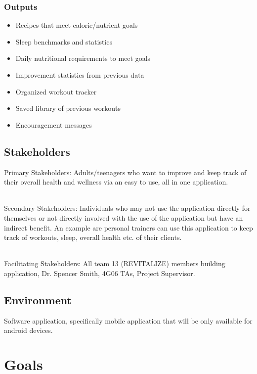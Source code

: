 \documentclass[12pt,letterpaper]{article}
\begin{document}
\subsubsection{Outputs}
\begin{itemize}
    \item Recipes that meet calorie/nutrient goals
    \item Sleep benchmarks and statistics
    \item Daily nutritional requirements to meet goals
    \item Improvement statistics from previous data
    \item Organized workout tracker
    \item Saved library of previous workouts
    \item Encouragement messages
\end{itemize}


\subsection{Stakeholders}

\par
Primary Stakeholders: Adults/teenagers who want to improve and keep track of their overall health and wellness via an easy to use, all in one application.

\noindent
\\
Secondary Stakeholders: Individuals who may not use the application directly for themselves or not directly involved with the use of the application but have an indirect benefit. An example are personal trainers can use this application to keep track of workouts, sleep, overall health etc. of their clients.

\noindent
\\
Facilitating Stakeholders: All team 13 (REVITALIZE) members building application, Dr. Spencer Smith, 4G06 TAs, Project Supervisor.

\subsection{Environment}

Software application, specifically mobile application that will be only available for android devices.

\section{Goals}
\end{document}
